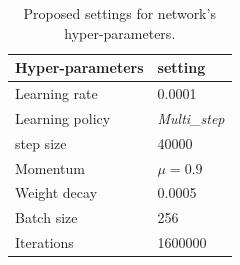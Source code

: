 \begin{table}[!htb]
\begin{minipage}{.5\linewidth}
\begin{table}[H]
\begin{tabular}{ |p{3.8cm}|p{1.7cm}| }
			\textbf{Hyper-parameters} & \textbf{setting }\\
			\hline
			Learning rate & 0.0001\\
			\hline
			Learning policy    & \textit{Multi\_step} \\
			\hline
			step size   & 40000 \\
			\hline
			Momentum & $\mu = 0.9$\\
			\hline
			Weight decay & 0.0005 \\
			\hline
			Batch size & 256 \\
			\hline
			Iterations & 1600000 \\
			\hline
			\end{tabular}
				\caption{Proposed settings for network's hyper-parameters.}
				\label{myucsd3}
		\end{table}
    \end{minipage} 
\end{table}



%

